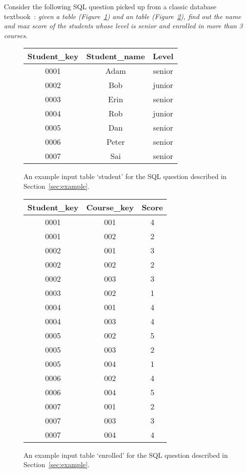 
Consider the following SQL question picked up from a classic
database textbook~\cite{cowbook}: \textit{given a  table (Figure~\ref{tbl:student})
and an  table (Figure~\ref{tbl:enrolled}), find out the name and max score of the
students whose level is senior and enrolled in more than 3 courses}.



\begin{figure}[t]
	\centering
\begin{tabular}{|c|c|c|}
\hline
 Student\_key& Student\_name & Level\\
\hline
 0001 & Adam & senior \\
 \hline
 0002 & Bob & junior \\
 \hline
 0003 & Erin & senior \\
 \hline
 0004 & Rob & junior\\
 \hline
 0005 & Dan & senior \\
 \hline
 0006 & Peter & senior \\
 \hline
 0007 & Sai & senior \\
 \hline
\end{tabular}
	\caption{An example input table `student'
for the SQL question described in
Section~\ref{sec:example}.}
	\label{tbl:student}
\end{figure}


\begin{figure}[t]
	\centering
\begin{tabular}{|c|c|c|}
\hline
 Student\_key& Course\_key& Score \\
\hline
 0001 & 001 & 4 \\
\hline
 0001 & 002 & 2 \\
\hline
 0002 & 001 & 3 \\
\hline
 0002 & 002 & 2 \\
\hline
 0002 & 003 & 3 \\
\hline
 0003 & 002 & 1 \\
\hline
 0004 & 001 & 4 \\
\hline
 0004 & 003 & 4 \\
\hline
 0005 & 002 & 5 \\
\hline
 0005 & 003 & 2 \\
\hline
 0005 & 004 & 1 \\
\hline
 0006 & 002 & 4 \\
\hline
 0006 & 004 & 5 \\
\hline
 0007 & 001 & 2 \\
\hline
 0007 & 003 & 3 \\
\hline
 0007 & 004 & 4 \\
 \hline
\end{tabular}
	\caption{An example input table  `enrolled'
for the SQL question described in
Section~\ref{sec:example}.}
	\label{tbl:enrolled}
\end{figure}	

